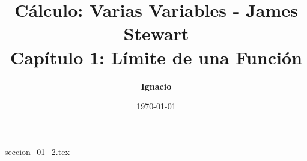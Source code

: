 \documentclass[11pt,spanish,oneside]{report}
\title{\textbf{Cálculo: Varias Variables - James Stewart} \\ \Large Capítulo 1: Límite de una Función}
\author{\textbf{Ignacio}}
\date{\today}
\begin{document}
\maketitle

{seccion_01_2.tex}
\end{document}
